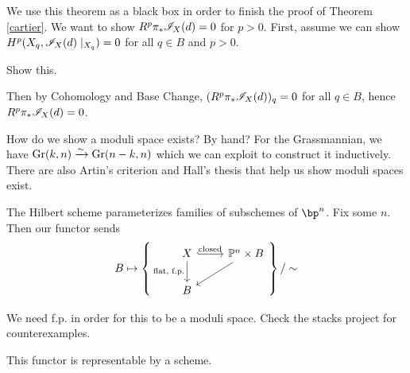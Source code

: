 \documentclass[12pt]{article}
\begin{document}
We use this theorem as a black box in order to finish the proof of Theorem \ref{cartier}. We want to show $R^p \pi_* \mathscr{I}_X(d) = 0$ for $p > 0$. First, assume we can show $H^p(X_q, \mathscr{I}_X(d) \mid_{X_q}) = 0$ for all $q \in B$ and $p > 0$. 

\begin{todo}
  Show this.
\end{todo}

Then by Cohomology and Base Change, $(R^p \pi_* \mathscr{I}_X(d))_q = 0$ for all $q \in B$, hence $R^p \pi_* \mathscr{I}_X(d) = 0$. 

\begin{question}
  How do we show a moduli space exists? By hand? For the Grassmannian, we have $\operatorname{Gr}(k,n) \xrightarrow{\sim} \operatorname{Gr}(n-k,n)$ which we can exploit to construct it inductively. There are also Artin's criterion and Hall's thesis that help us show moduli spaces exist. 
\end{question}

The Hilbert scheme parameterizes families of subschemes of $\bp^n$. Fix some $n$. Then our functor sends
\[B \mapsto \left\{\begin{tikzcd}
X \arrow[d, "{\text{flat, f.p.}}"'] \arrow[r, "\text{closed}", hook] & \mathbb{P}^n \times B \arrow[ld] \\
B                                                                    &                                 
\end{tikzcd}\right\}/\sim\]

\begin{rem}
  We need f.p. in order for this to be a moduli space. Check the stacks project for counterexamples.
\end{rem}

\begin{thm}[Grothendieck]
  This functor is representable by a scheme. 
\end{thm}
\end{document}
